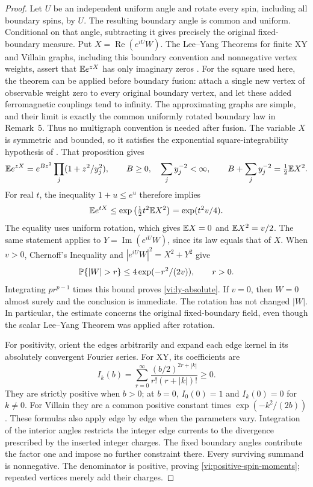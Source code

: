 \begin{proof}
Let $U$ be an independent uniform angle and rotate every spin, including
all boundary spins, by $U$.  The resulting boundary angle is common and
uniform.  Conditional on that angle, subtracting it gives precisely the
original fixed-boundary measure.  Put
$X=\operatorname{Re}(e^{iU}W)$.  The Lee--Yang Theorems for finite XY and
Villain graphs, including this boundary convention and nonnegative vertex
weights, assert that $\mathbb E e^{zX}$ has only imaginary zeros
\citep[Theorems~1 and~3, Remark~5]{NewmanWu2019}.
For the square used here, the theorem can be applied before boundary
fusion: attach a single new vertex of observable weight zero to every
original boundary vertex, and let these added ferromagnetic couplings
tend to infinity.  The approximating graphs are simple, and their limit
is exactly the common uniformly rotated boundary law in Remark~5.
Thus no multigraph convention is needed after fusion.
The variable $X$ is symmetric and bounded, so it satisfies the exponential
square-integrability hypothesis of
\citet[Proposition~13]{NewmanWu2019}.  That proposition gives
\[
 \mathbb E e^{zX}=e^{Bz^2}\prod_j(1+z^2/y_j^2),\qquad
 B\geq0,\quad \sum_jy_j^{-2}<\infty,\qquad
 B+\sum_jy_j^{-2}=\tfrac12\mathbb E X^2.
\]
For real $t$, the inequality $1+u\leq e^u$ therefore implies
\begin{equation}\label{vi:ly-subgaussian}
 \mathbb E e^{tX}\leq \exp\left(\tfrac12t^2\mathbb E X^2\right)
                 =\exp(t^2v/4).
\end{equation}
The equality uses uniform rotation, which gives $\mathbb E X=0$ and
$\mathbb E X^2=v/2$.  The same statement applies to
$Y=\operatorname{Im}(e^{iU}W)$, since its law equals that of $X$.
When $v>0$, Chernoff's Inequality and
$|e^{iU}W|^2=X^2+Y^2$ give
\[
 \Prob\{|W|>r\}\leq4\exp(-r^2/(2v)),\qquad r>0.
\]
Integrating $p r^{p-1}$ times this bound proves
\eqref{vi:ly-absolute}.  If $v=0$, then $W=0$ almost surely and the
conclusion is immediate.  The rotation has not changed $|W|$.
In particular, the estimate concerns the original fixed-boundary field,
even though the scalar Lee--Yang Theorem was applied after rotation.

For positivity, orient the edges arbitrarily and expand each edge kernel
in its absolutely convergent Fourier series.  For XY, its coefficients are
\[
 I_k(b)=\sum_{r=0}^{\infty}
       \frac{(b/2)^{2r+|k|}}{r!(r+|k|)!}\geq0.
\]
They are strictly positive when $b>0$; at $b=0$, $I_0(0)=1$
and $I_k(0)=0$ for $k\ne0$.  For Villain they are a common positive constant times
$\exp(-k^2/(2b))$.  These formulas also apply edge by edge when the
parameters vary.  Integration of the interior angles restricts the integer
edge currents to the divergence prescribed by the inserted integer charges.
The fixed boundary angles contribute the factor one and impose no further
constraint there.  Every surviving summand is nonnegative.  The denominator
is positive, proving \eqref{vi:positive-spin-moments}; repeated vertices
merely add their charges.
\end{proof}

